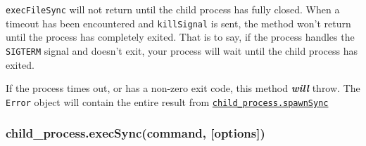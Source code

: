\texttt{execFileSync} will not return until the child process has fully
closed. When a timeout has been encountered and \texttt{killSignal} is
sent, the method won't return until the process has completely exited.
That is to say, if the process handles the \texttt{SIGTERM} signal and
doesn't exit, your process will wait until the child process has exited.

If the process times out, or has a non-zero exit code, this method
\textbf{\emph{will}} throw. The \texttt{Error} object will contain the
entire result from
\hyperref[childux5fprocessux5fchildux5fprocessux5fspawnsyncux5fcommandux5fargsux5foptions]{\texttt{child\_process.spawnSync}}

\subsubsection{child\_process.execSync(command,
{[}options{]})}\label{childux5fprocess.execsynccommand-options}

